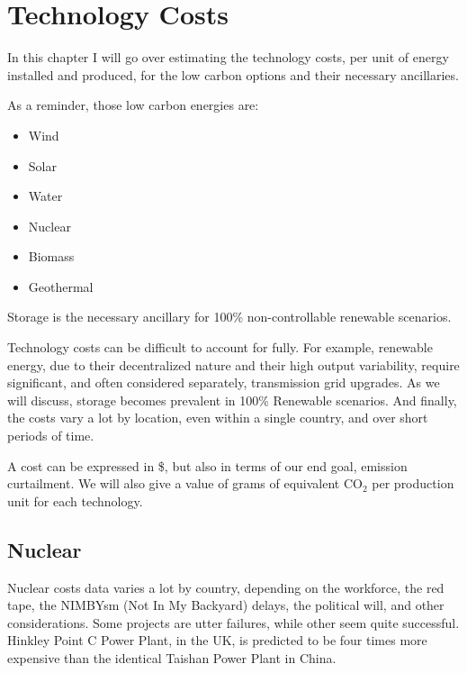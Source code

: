 \setchapterpreamble[u]{\margintoc}
\chapter{Technology Costs}

In this chapter I will go over estimating the technology costs, per unit of energy installed and produced, for the low carbon options and their necessary ancillaries. 

\begin{kaobox}[frametitle=Low Carbon Energies]
As a reminder, those low carbon energies are:

\begin{itemize}
	\item Wind
	\item Solar
	\item Water
	\item Nuclear
	\item Biomass
	\item Geothermal
\end{itemize}

Storage is the necessary ancillary for 100\% non-controllable renewable scenarios.

\end{kaobox}


Technology costs can be difficult to account for fully. For example, renewable energy, due to their decentralized nature and their high output variability, require significant, and often considered separately, transmission grid upgrades. As we will discuss, storage becomes prevalent in 100\% Renewable scenarios. And finally, the costs vary a lot by location, even within a single country, and over short periods of time.

A cost can be expressed in \$, but also in terms of our end goal, emission curtailment. We will also give a value of grams of equivalent $\mathrm{CO_2}$ per production unit for each technology.

\section{Nuclear}

Nuclear costs data varies a lot by country, depending on the workforce, the red tape, the NIMBYsm (Not In My Backyard) delays, the political will, and other considerations. Some projects are utter failures, while other seem quite successful. Hinkley Point C Power Plant, in the UK, is predicted to be four times more expensive than the identical Taishan Power Plant in China.

